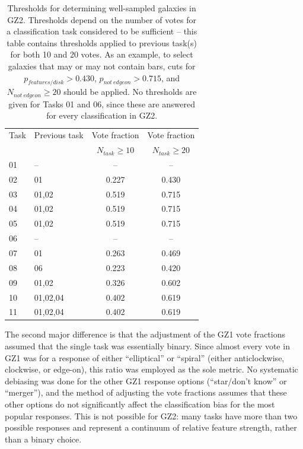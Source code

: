 \documentclass[useAMS,usenatbib]{mn2e}
\begin{document}
\begin{table}
\centering
 \begin{tabular}{@{}llcc}
 \hline
\multicolumn{1}{l}{Task} &
\multicolumn{1}{l}{Previous task} &
\multicolumn{1}{c}{Vote fraction} &
\multicolumn{1}{c}{Vote fraction}
\\ 
\multicolumn{1}{l}{} &
\multicolumn{1}{l}{} &
\multicolumn{1}{c}{$N_{task}\geq10$} &
\multicolumn{1}{c}{$N_{task}\geq20$}
\\ 
\hline					
01                      & --        & --        & --        \\
02                      & 01        & 0.227     & 0.430     \\
03                      & 01,02     & 0.519     & 0.715     \\
04                      & 01,02     & 0.519     & 0.715     \\
05                      & 01,02     & 0.519     & 0.715     \\
06                      & --        & --        & --        \\
07                      & 01        & 0.263     & 0.469     \\
08                      & 06        & 0.223     & 0.420     \\
09                      & 01,02     & 0.326     & 0.602     \\
10                      & 01,02,04  & 0.402     & 0.619     \\
11                      & 01,02,04  & 0.402     & 0.619     \\
\hline
 \end{tabular}
 \caption{Thresholds for determining well-sampled galaxies in GZ2. Thresholds depend on the number of votes for a classification task considered to be sufficient -- this table contains thresholds applied to previous task(s) for both 10 and 20 votes. As an example, to select galaxies that may or may not contain bars, cuts for $p_{features/disk}>0.430$, $p_{not~edgeon}>0.715$, and $N_{not~edgeon}\geq20$ should be applied. No thresholds are given for Tasks 01 and 06, since these are answered for every classification in GZ2. \label{tbl-thresholds}}
\end{table}

The second major difference is that the adjustment of the GZ1 vote fractions assumed that the single task was essentially binary. Since almost every vote in GZ1 was for a response of either ``elliptical'' or ``spiral'' (either anticlockwise, clockwise, or edge-on), this ratio was employed as the sole metric. No systematic debiasing was done for the other GZ1 response options (``star/don't know'' or ``merger''), and the method of adjusting the vote fractions assumes that these other options do not significantly affect the classification bias for the most popular responses. This is not possible for GZ2: many tasks have more than two possible responses and represent a continuum of relative feature strength, rather than a binary choice.
\end{document}
